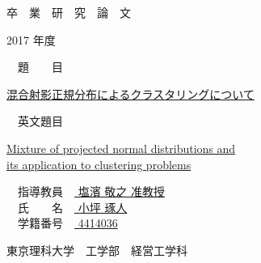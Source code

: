\documentclass[a4j,11pt]{jarticle}
\begin{document}
\begin{center}
{\Huge 卒　業　研　究　論　文}
\end{center}
\vspace{2cm}
\begin{center}
{\huge 2017 年度}
\end{center}
\vspace{3cm}
\begin{flushleft}
{\huge　題　　目　}
\end{flushleft}
\begin{center}
{\huge \underline{混合射影正規分布によるクラスタリングについて}}\\
\end{center}
\vspace{0.5cm}
\begin{flushleft}
{\huge　英文題目　}
\end{flushleft}
\begin{center}
{\huge \underline{Mixture of projected normal distributions and}\\ 
\vspace{0.2cm}
\underline{its application to clustering problems}}\\
\end{center}
\vspace{4cm}
\begin{flushleft}
{\huge　指導教員　\underline{ 塩濱 敬之 准教授 }}\\
\vspace{5mm}
{\huge　氏　　名　\underline{ 小坪 琢人 }}\\
\vspace{5mm}
{\huge　学籍番号　\underline{ 4414036 }}
\end{flushleft}
\vspace{2cm}
\begin{flushright}
{\LARGE 東京理科大学　工学部　経営工学科}\\
\end{flushright}
\end{document}
